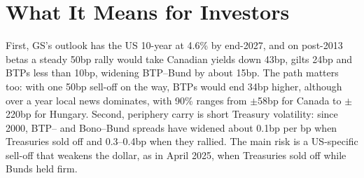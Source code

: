 \documentclass[11pt,a4paper]{article}
\begin{document}
\section*{What It Means for Investors}
First, GS's outlook has the US 10-year at 4.6\% by end-2027, and on post-2013 betas a steady 50bp rally would take Canadian yields down 43bp, gilts 24bp and BTPs less than 10bp, widening BTP–Bund by about 15bp. The path matters too: with one 50bp sell-off on the way, BTPs would end 34bp higher, although over a year local news dominates, with 90\% ranges from $\pm$58bp for Canada to $\pm$220bp for Hungary. Second, periphery carry is short Treasury volatility: since 2000, BTP– and Bono–Bund spreads have widened about 0.1bp per bp when Treasuries sold off and 0.3--0.4bp when they rallied. The main risk is a US-specific sell-off that weakens the dollar, as in April 2025, when Treasuries sold off while Bunds held firm.
\end{document}
